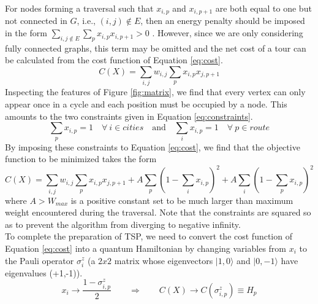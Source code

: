		For nodes forming a traversal such that $x_{i,p}$ and $x_{i,p+1}$ are both equal to one but not connected in $G$, i.e., $(i,j)\notin E$, then an energy penalty should be imposed in the form $\sum_{i,j \notin E}\sum_p x_{i,p}x_{i,p+1}>0$ \cite{lucas2014ising}.
		However, since we are only considering fully connected graphs, this term may be omitted and the net cost of a tour can be calculated from the cost function of Equation \ref{eq:cost}.
		\begin{equation}
			C(X)=\sum_{i,j}w_{i,j} \sum_p x_{i,p}x_{j,p+1} 
			\label{eq:cost}
		\end{equation}
		Inspecting the features of Figure \ref{fig:matrix}, we find that every vertex can only appear once in a cycle and each position must be occupied by a node. 
		This amounts to the two constraints given in Equation \ref{eq:constraints}.
		\begin{equation}
			\sum_p x_{i,p}=1 \quad \forall \: i \in cities \quad \text{and} \quad \sum_i x_{i,p}=1 \quad \forall \: p \in route
			\label{eq:constraints}
		\end{equation}
		By imposing these constraints to Equation \ref{eq:cost}, we find that the objective function to be minimized takes the form
		\begin{equation}
			C(X)=\sum_{i,j}w_{i,j} \sum_p x_{i,p}x_{j,p+1} + A\sum_p (1 - \sum_i x_{i,p})^2 + A\sum_i (1 - \sum_p x_{i,p})^2
			\label{eq:hamiltoniancircuit}
		\end{equation}
		where $A>W_{max}$ is a positive constant set to be much larger than maximum weight encountered during the traversal. Note that the constraints are squared so as to prevent the algorithm from diverging to negative infinity. \\
	
		To complete the preparation of TSP, we need to convert the cost function of Equation \ref{eq:cost} into a quantum Hamiltonian by changing variables from $x_i$ to the Pauli operator $\sigma_i^z$ (a $2x2$ matrix whose eigenvectors $|1,0\rangle$ and $|0,-1\rangle$ have eigenvalues (+1,-1)). 
		\begin{equation}
			x_i \rightarrow \frac{ 1-\sigma_{i,p}^z}{2} \qquad \Rightarrow \qquad C(X) \rightarrow C(\sigma_{i,p}^z) \equiv H_p
			\label{eq:transformation}
		\end{equation}
	
